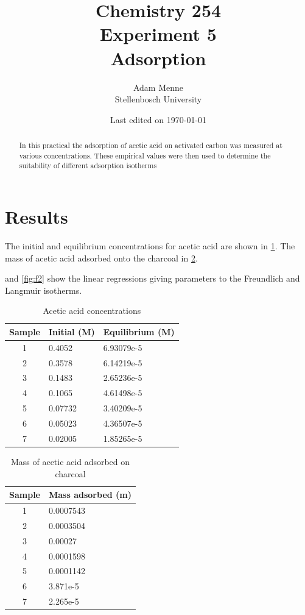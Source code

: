\documentclass[a4paper, british]{article}
\title{Chemistry 254\\ Experiment 5\\ Adsorption}
\date{Last edited on \today}
\author{Adam Menne\\ Stellenbosch University}
\begin{document}
\maketitle

\begin{abstract}
\noindent
In this practical the adsorption of acetic acid on activated carbon was measured at various concentrations. These empirical values were then used to determine the suitability of different adsorption isotherms
\end{abstract}

\tableofcontents

\newpage


\section{Results}

The initial and equilibrium concentrations for acetic acid are shown in \cref*{tab:conc}. The mass of acetic acid adsorbed onto the charcoal in \cref*{tab:mass}.

 and \cref*{fig:f2} show the linear regressions giving parameters to the Freundlich and Langmuir isotherms.

\begin{table}[H]
    \centering
    \caption{Acetic acid concentrations}
    \vspace*{2mm}
    \label{tab:conc}
    \begin{tabular}{cll}
    \toprule
    Sample & Initial (M) & Equilibrium (M) \\ \midrule
    1 & 0.4052 & 6.93079e-5 \\
    2 & 0.3578 & 6.14219e-5 \\
    3 & 0.1483 & 2.65236e-5 \\
    4 & 0.1065 & 4.61498e-5 \\
    5 & 0.07732 & 3.40209e-5 \\
    6 & 0.05023 & 4.36507e-5 \\
    7 & 0.02005 & 1.85265e-5 \\ \bottomrule
\end{tabular}
\end{table}

\begin{table}[H]
    \centering
    \caption{Mass of acetic acid adsorbed on charcoal}
    \vspace*{2mm}
    \label{tab:mass}
    \begin{tabular}{cl}
    \toprule
    Sample & Mass adsorbed (m) \\ \midrule
    1 & 0.0007543 \\
    2 & 0.0003504 \\
    3 & 0.00027 \\
    4 & 0.0001598 \\
    5 & 0.0001142 \\
    6 & 3.871e-5 \\
    7 & 2.265e-5
    \end{tabular}
    \end{table}
\end{document}
